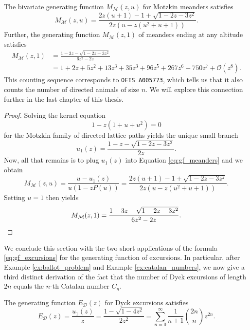 \begin{corollary} \label{cor:motzkin_meanders}
  The bivariate generating function $M_{\mathcal{M}}(z,u)$ for Motzkin meanders satisfies 
  $$
    M_{\mathcal{M}}(z,u) = \frac{2z(u + 1) - 1 + \sqrt{1 - 2z - 3 z^{2}}}{2z\left(u - z \left(u^{2}+u + 1\right)\right)}.
  $$
  Further, the generating function $M_{\mathcal{M}}(z, 1)$ of meanders ending at any altitude satisfies
  \begin{align*}
    M_{\mathcal{M}}(z, 1) &= \frac{1 - 3z - \sqrt{1 - 2z - 3z^2}}{6z^2 - 2z} \\
    &= 1 + 2z + 5z^{2} + 13z^{3} + 35z^{3} + 96z^{5} + 267z^{6} + 750z^7 + \mathcal{O}(z^8).
  \end{align*}
  This counting sequence corresponds to \href{https://oeis.org/A005773}{\texttt{OEIS A005773}}, which tells us that it also counts the number of directed animals of size $n$. We will explore this connection further in the last chapter of this thesis.
\end{corollary}

\begin{proof}
  Solving the kernel equation
  $$
    1 - z(1 + u + u^2) = 0
  $$
  for the Motzkin family of directed lattice paths yields the unique small branch
  $$
    u_1(z) = \frac{1 - z - \sqrt{1 - 2z - 3z^2}}{2z}.
  $$
  Now, all that remains is to plug $u_1(z)$ into Equation \eqref{eq:gf_meanders} and we obtain
  $$
    M_{\mathcal{M}}(z,u) = \frac{u - u_1(z)}{u(1 - zP(u))} = \frac{2z(u + 1) - 1 + \sqrt{1 - 2z - 3 z^{2}}}{2z\left(u - z \left(u^{2}+u + 1\right)\right)}.
  $$
  Setting $u = 1$ then yields
  \begin{equation*}
    M_{\mathcal{M}}(z,1) = \frac{1 - 3z - \sqrt{1 - 2z - 3z^2}}{6z^2 - 2z}. \qedhere
  \end{equation*}
\end{proof}

We conclude this section with the two short applications of the formula \eqref{eq:gf_excursions} for the generating function of excursions. In particular, after Example \ref{ex:ballot_problem} and Example \ref{ex:catalan_numbers}, we now give a third distinct derivation of the fact that the number of Dyck excursions of length $2n$ equals the $n$-th Catalan number $C_n$.

\begin{corollary}
   The generating function $E_{\mathcal{D}}(z)$ for Dyck excursions satisfies 
  $$
    E_{\mathcal{D}}(z) = \frac{u_1(z)}{z} = \frac{1 - \sqrt{1 - 4z^2}}{2z^2} = \sum_{n=0}^\infty \frac{1}{n+1}\binom{2n}{n}z^{2n}.
  $$
\end{corollary}

